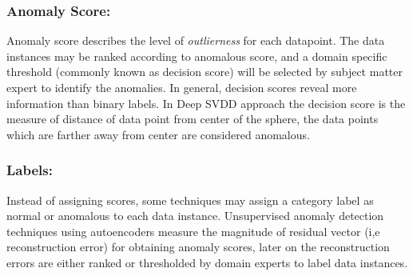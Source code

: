 \subsubsection{Anomaly Score:}
 Anomaly score describes the level of \textit{outlierness} for  each datapoint. The data instances may be ranked according to  anomalous score, and a domain specific threshold (commonly known as decision score) will be selected by subject matter expert to identify the anomalies.  In general, decision scores reveal more information than binary labels. In Deep SVDD approach the decision score is the measure of distance of data point from center of the sphere, the data points which are farther away from center are considered anomalous.

\subsubsection{Labels:} Instead of assigning scores, some techniques may assign a category label as normal or anomalous to each data instance. Unsupervised anomaly detection techniques using autoencoders measure  the magnitude of residual vector (i,e reconstruction error) for obtaining anomaly scores, later on the reconstruction errors are either ranked or thresholded by domain experts to label data instances.

